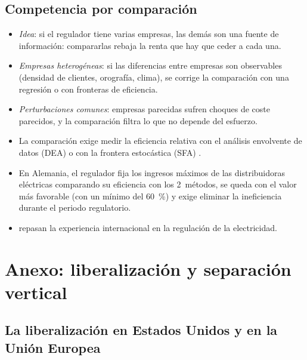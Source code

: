 \documentclass[11pt]{article}
\begin{document}
\subsection{Competencia por comparación}\label{anexo:extensiones-ys}

\begin{itemize}
\item \emph{Idea}: si el regulador tiene varias empresas, las demás son una fuente de información: compararlas rebaja la renta que hay que ceder a cada una.
\item \emph{Empresas heterogéneas}: si las diferencias entre empresas son observables (densidad de clientes, orografía, clima), se corrige la comparación con una regresión o con fronteras de eficiencia\nocite{Shleifer1985Theory}.
\item \emph{Perturbaciones comunes}: empresas parecidas sufren choques de coste parecidos, y la comparación filtra lo que no depende del esfuerzo\nocite{ArmstrongSappington2007Recent}.
\item La comparación exige medir la eficiencia relativa con el análisis envolvente de datos (DEA) o con la frontera estocástica (SFA)  .
\item En Alemania, el regulador fija los ingresos máximos de las distribuidoras eléctricas comparando su eficiencia con los 2~métodos, se queda con el valor más favorable (con un mínimo del 60~\%) y exige eliminar la ineficiencia durante el periodo regulatorio\nocite{BNetzA2026Effizienzvergleich,ARegV2007}.
\item \textcite{JamasbPollitt2001Benchmarking} repasan la experiencia internacional en la regulación de la electricidad.
\end{itemize}

\section{Anexo: liberalización y separación vertical}\label{anexo:separacion}

\subsection{La liberalización en Estados Unidos y en la Unión Europea}\label{anexo:historia-liberalizacion}
\end{document}
